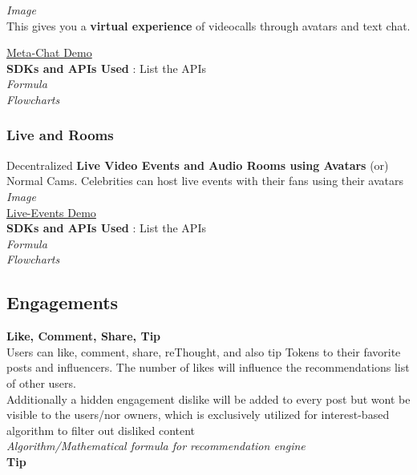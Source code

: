 \documentclass[10pt]{article}
\begin{document}
\textit{Image}\\

This gives you a \textbf{virtual experience} of videocalls through avatars and text chat.

\hyperlink{https://sample.com}{Meta-Chat Demo}\\

\textbf{SDKs and APIs Used} : List the APIs\\

\textit{Formula\\
Flowcharts}

\subsubsection{Live and Rooms}

Decentralized \textbf{Live Video Events and Audio Rooms using Avatars} (or) Normal Cams. Celebrities can host live events with their fans using their avatars\\

\textit{Image}\\
\hyperlink{https://sample.com}{Live-Events Demo}\\

\textbf{SDKs and APIs Used} : List the APIs\\

\textit{Formula\\
Flowcharts}

\subsection{Engagements}

\textbf{Like, Comment, Share, Tip}\\

Users can like, comment, share, reThought, and also tip Tokens to their favorite posts and influencers. The number of likes will influence the recommendations list of other users.\\

Additionally a hidden engagement dislike will be added to every post but won\textsc{}t be visible to the users/nor owners, which is exclusively utilized for interest-based algorithm to filter out disliked content\\

\textit{Algorithm/Mathematical formula for recommendation engine}\\

\textbf{Tip}\\
\end{document}
